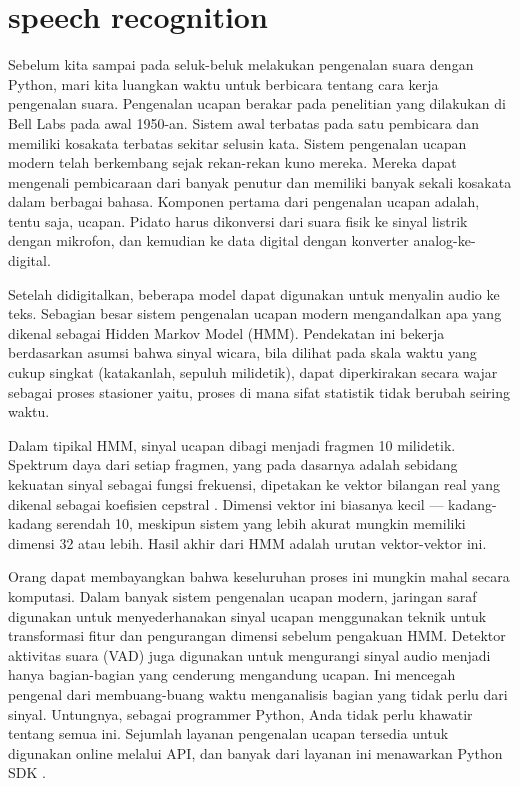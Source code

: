 \section{speech recognition}
\par Sebelum kita sampai pada seluk-beluk melakukan pengenalan suara dengan Python, mari kita luangkan waktu untuk berbicara tentang cara kerja pengenalan suara. Pengenalan ucapan berakar pada penelitian yang dilakukan di Bell Labs pada awal 1950-an. Sistem awal terbatas pada satu pembicara dan memiliki kosakata terbatas sekitar selusin kata. Sistem pengenalan ucapan modern telah berkembang sejak rekan-rekan kuno mereka. Mereka dapat mengenali pembicaraan dari banyak penutur dan memiliki banyak sekali kosakata dalam berbagai bahasa. Komponen pertama dari pengenalan ucapan adalah, tentu saja, ucapan. Pidato harus dikonversi dari suara fisik ke sinyal listrik dengan mikrofon, dan kemudian ke data digital dengan konverter analog-ke-digital. 
\par Setelah didigitalkan, beberapa model dapat digunakan untuk menyalin audio ke teks. Sebagian besar sistem pengenalan ucapan modern mengandalkan apa yang dikenal sebagai Hidden Markov Model (HMM). Pendekatan ini bekerja berdasarkan asumsi bahwa sinyal wicara, bila dilihat pada skala waktu yang cukup singkat (katakanlah, sepuluh milidetik), dapat diperkirakan secara wajar sebagai proses stasioner yaitu, proses di mana sifat statistik tidak berubah seiring waktu.
\par Dalam tipikal HMM, sinyal ucapan dibagi menjadi fragmen 10 milidetik. Spektrum daya dari setiap fragmen, yang pada dasarnya adalah sebidang kekuatan sinyal sebagai fungsi frekuensi, dipetakan ke vektor bilangan real yang dikenal sebagai koefisien cepstral . Dimensi vektor ini biasanya kecil — kadang-kadang serendah 10, meskipun sistem yang lebih akurat mungkin memiliki dimensi 32 atau lebih. Hasil akhir dari HMM adalah urutan vektor-vektor ini.
\par Orang dapat membayangkan bahwa keseluruhan proses ini mungkin mahal secara komputasi. Dalam banyak sistem pengenalan ucapan modern, jaringan saraf digunakan untuk menyederhanakan sinyal ucapan menggunakan teknik untuk transformasi fitur dan pengurangan dimensi sebelum pengakuan HMM. Detektor aktivitas suara (VAD) juga digunakan untuk mengurangi sinyal audio menjadi hanya bagian-bagian yang cenderung mengandung ucapan. Ini mencegah pengenal dari membuang-buang waktu menganalisis bagian yang tidak perlu dari sinyal.
Untungnya, sebagai programmer Python, Anda tidak perlu khawatir tentang semua ini. Sejumlah layanan pengenalan ucapan tersedia untuk digunakan online melalui API, dan banyak dari layanan ini menawarkan Python SDK .
